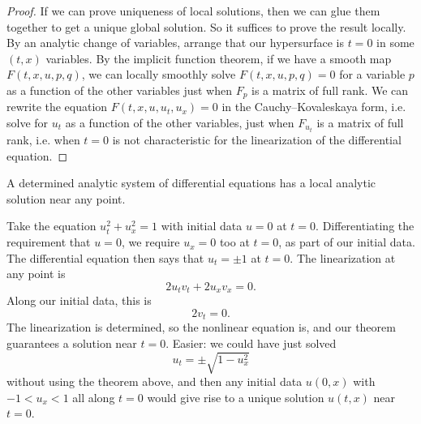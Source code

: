 \begin{proof}
If we can prove uniqueness of local solutions, then we can glue them together to get a unique global solution.
So it suffices to prove the result locally.
By an analytic change of variables, arrange that our hypersurface is \(t=0\) in some \((t,x)\) variables.
By the implicit function theorem, if we have a smooth map \(F(t,x,u,p,q)\), we can locally smoothly solve \(F(t,x,u,p,q)=0\) for a variable \(p\) as a function of the other variables just when  \(F_p\) is a matrix of full rank.
We can rewrite the equation \(F(t,x,u,u_t,u_x)=0\) in the Cauchy--Kovaleskaya form, i.e. solve for \(u_t\) as a function of the other variables, just when \(F_{u_t}\) is a matrix of full rank, i.e. when \(t=0\) is not characteristic for the linearization of the differential equation.
\end{proof}
\begin{corollary}
A determined analytic system of differential equations has a local analytic solution near any point.
\end{corollary}
\begin{example}
Take the equation \(u_t^2+u_x^2=1\) with initial data \(u=0\) at \(t=0\).
Differentiating the requirement that \(u=0\), we require \(u_x=0\) too at \(t=0\), as part of our initial data.
The differential equation then says that \(u_t=\pm 1\) at \(t=0\).
The linearization at any point is
\[
2u_t v_t + 2u_x v_x=0.
\]
Along our initial data, this is 
\[
2v_t = 0.
\]
The linearization is determined, so the nonlinear equation is, and our theorem guarantees a solution near \(t=0\).
Easier: we could have just solved
\[
u_t = \pm \sqrt{1-u_x^2}
\]
without using the theorem above, and then any initial data \(u(0,x)\) with \(-1 < u_x < 1\) all along \(t=0\) would give rise to a unique solution \(u(t,x)\) near \(t=0\).
\end{example}

